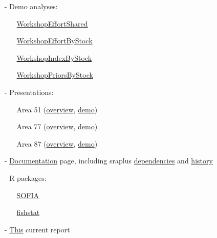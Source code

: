 \documentclass[12pt]{article}
\newcommand\blue[1]{\textcolor{darkblue}{#1}}
\newcommand\sofialink[2]{\blue{\href{https://github.com/sofia-taf/#1}{\sf #2}}}
\begin{document}
\begin{itemize}
  \item[-] Demo analyses:\\[-3.5ex]
  \begin{itemize}
    \item[] \sofialink{WorkshopEffortShared}{WorkshopEffortShared}\\[-4ex]
    \item[] \sofialink{WorkshopEffortByStock}{WorkshopEffortByStock}\\[-4ex]
    \item[] \sofialink{WorkshopIndexByStock}{WorkshopIndexByStock}\\[-4ex]
    \item[] \sofialink{WorkshopPriorsByStock}{WorkshopPriorsByStock}\\[-3ex]
  \end{itemize}
  \item[-] Presentations:\\[-3.5ex]
  \begin{itemize}
    \item[] Area 51
    (\sofialink{doc/blob/main/presentations/area_51_2024/overview.pdf}{overview},
    \sofialink{doc/blob/main/presentations/area_51_2024/demo.pdf}{demo})\\[-4ex]
    \item[] Area 77
    (\sofialink{doc/blob/main/presentations/area_77/overview.pdf}{overview},
    \sofialink{doc/blob/main/presentations/area_77/demo.pdf}{demo})\\[-4ex]
    \item[] Area 87
    (\sofialink{doc/blob/main/presentations/area_87/overview.pdf}{overview},
    \sofialink{doc/blob/main/presentations/area_87/demo.pdf}{demo})\\[-3ex]
  \end{itemize}
  \item[-] \sofialink{doc}{Documentation} page, including sraplus
  \sofialink{doc/blob/main/sraplus_dependencies.md}{dependencies} and
  \sofialink{doc/blob/main/sraplus_history.md}{history}\\[-3ex]
  \item[-] R packages:
  \begin{itemize}
    \item[] \sofialink{SOFIA}{SOFIA}\\[-4ex]
    \item[] \sofialink{fishstat}{fishstat}\\[-3ex]
  \end{itemize}
  \item[-] \blue{\href{https://arni-magnusson.github.io/pdf/2024-sofia-taf.pdf}
    {{\sf This}}} current report
\end{itemize}
\end{document}
